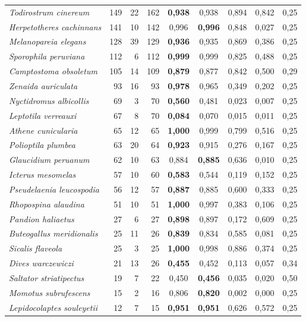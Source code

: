 \begin{longtable}{lrrrccccc}
\textit{Todirostrum cinereum} & 149 & 22 & 162 & \textbf{0{,}938} & 0{,}938 & 0{,}894 & 0{,}842 & 0{,}25\\
\textit{Herpetotheres cachinnans} & 141 & 10 & 142 & 0{,}996 & \textbf{0{,}996} & 0{,}848 & 0{,}027 & 0{,}25\\
\textit{Melanopareia elegans} & 128 & 39 & 129 & \textbf{0{,}936} & 0{,}935 & 0{,}869 & 0{,}386 & 0{,}25\\
\textit{Sporophila peruviana} & 112 & 6 & 112 & \textbf{0{,}999} & 0{,}999 & 0{,}825 & 0{,}488 & 0{,}25\\
\textit{Camptostoma obsoletum} & 105 & 14 & 109 & \textbf{0{,}879} & 0{,}877 & 0{,}842 & 0{,}500 & 0{,}29\\
\textit{Zenaida auriculata} & 93 & 16 & 93 & \textbf{0{,}978} & 0{,}965 & 0{,}349 & 0{,}202 & 0{,}25\\
\textit{Nyctidromus albicollis} & 69 & 3 & 70 & \textbf{0{,}560} & 0{,}481 & 0{,}023 & 0{,}007 & 0{,}25\\
\textit{Leptotila verreauxi} & 67 & 8 & 70 & \textbf{0{,}084} & 0{,}070 & 0{,}015 & 0{,}011 & 0{,}25\\
\textit{Athene cunicularia} & 65 & 12 & 65 & \textbf{1{,}000} & 0{,}999 & 0{,}799 & 0{,}516 & 0{,}25\\
\textit{Polioptila plumbea} & 63 & 20 & 64 & \textbf{0{,}923} & 0{,}915 & 0{,}276 & 0{,}167 & 0{,}25\\
\textit{Glaucidium peruanum} & 62 & 10 & 63 & 0{,}884 & \textbf{0{,}885} & 0{,}636 & 0{,}010 & 0{,}25\\
\textit{Icterus mesomelas} & 57 & 10 & 60 & \textbf{0{,}583} & 0{,}544 & 0{,}119 & 0{,}152 & 0{,}25\\
\textit{Pseudelaenia leucospodia} & 56 & 12 & 57 & \textbf{0{,}887} & 0{,}885 & 0{,}600 & 0{,}333 & 0{,}25\\
\textit{Rhopospina alaudina} & 51 & 10 & 51 & \textbf{1{,}000} & 0{,}997 & 0{,}383 & 0{,}106 & 0{,}25\\
\textit{Pandion haliaetus} & 27 & 6 & 27 & \textbf{0{,}898} & 0{,}897 & 0{,}172 & 0{,}609 & 0{,}25\\
\textit{Buteogallus meridionalis} & 25 & 11 & 26 & \textbf{0{,}839} & 0{,}834 & 0{,}585 & 0{,}081 & 0{,}25\\
\textit{Sicalis flaveola} & 25 & 3 & 25 & \textbf{1{,}000} & 0{,}998 & 0{,}886 & 0{,}374 & 0{,}25\\
\textit{Dives warczewiczi} & 21 & 13 & 26 & \textbf{0{,}455} & 0{,}452 & 0{,}113 & 0{,}057 & 0{,}34\\
\textit{Saltator striatipectus} & 19 & 7 & 22 & 0{,}450 & \textbf{0{,}456} & 0{,}035 & 0{,}020 & 0{,}50\\
\textit{Momotus subrufescens} & 15 & 2 & 16 & 0{,}806 & \textbf{0{,}820} & 0{,}002 & 0{,}000 & 0{,}25\\
\textit{Lepidocolaptes souleyetii} & 12 & 7 & 15 & \textbf{0{,}951} & \textbf{0{,}951} & 0{,}626 & 0{,}572 & 0{,}25\\
\end{longtable}
\endgroup

